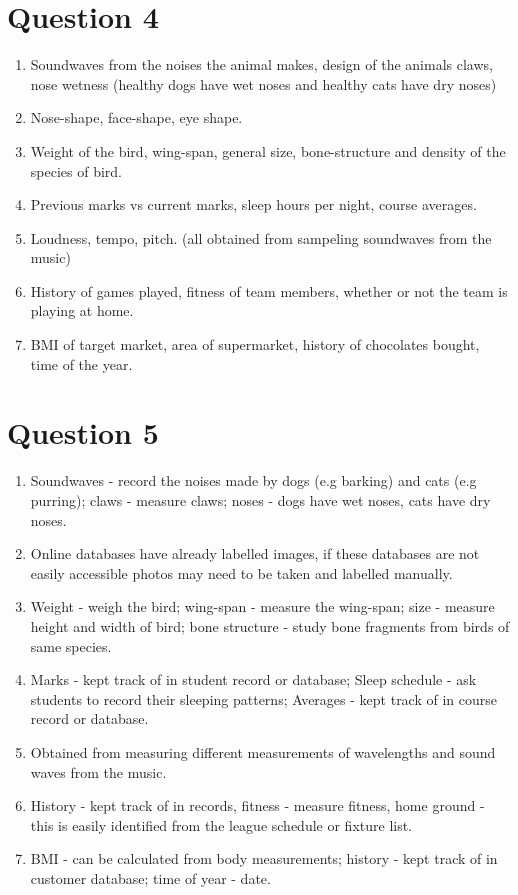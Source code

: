 \documentclass{article}
\begin{document}
\section{Question 4}
	\begin{enumerate}[label=\alph*)]
		\item Soundwaves from the noises the animal makes, design of the animals claws, 			nose wetness (healthy dogs have wet noses and healthy cats have dry noses)
		\item Nose-shape, face-shape, eye shape.
		\item Weight of the bird, wing-span, general size, bone-structure and density of 		the species of bird.
		\item Previous marks vs current marks, sleep hours per night, course averages.
		\item Loudness, tempo, pitch. (all obtained from sampeling soundwaves from the 				music)
		\item History of games played, fitness of team members, whether or not the team 			is playing at home.
		\item BMI of target market, area of supermarket, history of chocolates bought, 				time of the year.
	\end{enumerate}
	
		
\section{Question 5}
	\begin{enumerate}[label=\alph*)]
	\item Soundwaves - record the noises made by dogs (e.g barking) and cats (e.g 				purring); claws - measure claws; noses - dogs have wet noses, cats have dry noses.
	\item Online databases have already labelled images, if these databases are not 			easily accessible photos may need to be taken and labelled manually.
	\item Weight - weigh the bird; wing-span - measure the wing-span; size - measure 			height and width of bird; bone structure - study bone fragments from birds of same 			species.
	\item Marks - kept track of in student record or database; Sleep schedule - ask 			students to record their sleeping patterns; Averages - kept track of in course 				record or database.
	\item Obtained from measuring different measurements of wavelengths and sound waves 		from the music.
	\item History - kept track of in records, fitness - measure fitness, home ground - 			this is easily identified from the league schedule or fixture list.
	\item BMI - can be calculated from body measurements; history - kept track of in 			customer database; time of 	year - date.
	\end{enumerate}
		
\end{document}
